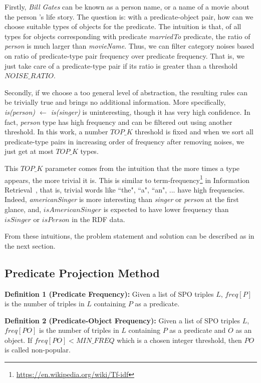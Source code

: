 \documentclass{acm_proc_article-sp}
\begin{document}
Firstly, \textit{Bill Gates} can be known as a person name, or a name of a movie about the person 's life story. The question is: with a predicate-object pair, how can we choose suitable types of objects for the predicate. The intuition is that, of all types for objects corresponding with predicate \textit{marriedTo} predicate, the ratio of \textit{person} is much larger than \textit{movieName}. Thus, we can filter category noises based on ratio of predicate-type pair frequency over predicate frequency. That is, we just take care of a predicate-type pair if its ratio is greater than a threshold $NOISE\_RATIO$.

Secondly, if we choose a too general level of abstraction, the resulting rules can be trivially true and brings no additional information. More specifically, \textit{is(person) $\leftarrow$ is(singer)} is uninteresting, though it has very high confidence. In fact, \textit{person} type has high frequency and can be filtered out using another threshold. In this work, a number $TOP\_K$ threshold is fixed and when we sort all predicate-type pairs in increasing order of frequency after removing noises, we just get at most $TOP\_K$ types.

This $TOP\_K$ parameter comes from the intuition that the more times a type appears, the more trivial it is. This is similar to term-frequency\footnote{\url{https://en.wikipedia.org/wiki/Tf-idf}} in Information Retrieval~\cite{ref2}, that is, trivial words like ``the", ``a", ``an", ... have high frequencies. Indeed, \textit{americanSinger} is more interesting than \textit{singer} or \textit{person} at the first glance, and, $isAmericanSinger$ is expected to have lower frequency than $isSinger$ or $isPerson$ in the RDF data.

From these intuitions, the problem statement and solution can be described as in the next section.

\subsection{Predicate Projection Method\\}

\textbf{Definition 1 (Predicate Frequency):} Given a list of SPO triples $L$, $freq[P]$ is the number of triples in $L$ containing $P$ as a predicate.

\textbf{Definition 2 (Predicate-Object Frequency):} Given a list of SPO triples $L$, $freq[PO]$ is the number of triples in $L$ containing $P$ as a predicate and $O$ as an object. If $freq[PO] < MIN\_FREQ$ which is a chosen integer threshold, then $PO$ is called non-popular.
\end{document}
